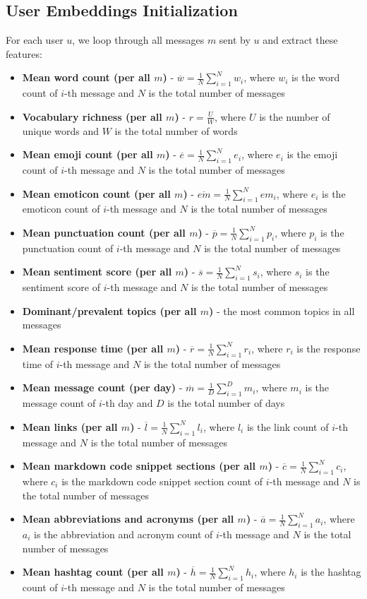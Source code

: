 \documentclass{article}
\begin{document}
\subsection{User Embeddings Initialization}
For each user $u$, we loop through all messages $m$ sent by $u$ and extract these features:
\begin{itemize}
	\item \textbf{Mean word count (per all $m$)} - \(\overline{w} = \frac{1}{N} \sum_{i=1}^{N} w_i \), where $w_i$ is the word count of $i$-th message and $N$ is the total number of messages
	\item \textbf{Vocabulary richness (per all $m$)} - \(r = \frac{U}{W} \), where $U$ is the number of unique words and $W$ is the total number of words
	\item \textbf{Mean emoji count (per all $m$)} - \(\overline{e} = \frac{1}{N} \sum_{i=1}^{N} e_i \), where $e_i$ is the emoji count of $i$-th message and $N$ is the total number of messages
	\item \textbf{Mean emoticon count (per all $m$)} - \(\overline{em} = \frac{1}{N} \sum_{i=1}^{N} em_i \), where $e_i$ is the emoticon count of $i$-th message and $N$ is the total number of messages
	\item \textbf{Mean punctuation count (per all $m$)} - \(\overline{p} = \frac{1}{N} \sum_{i=1}^{N} p_i \), where $p_i$ is the punctuation count of $i$-th message and $N$ is the total number of messages
	\item \textbf{Mean sentiment score (per all $m$)} - \(\overline{s} = \frac{1}{N} \sum_{i=1}^{N} s_i \), where $s_i$ is the sentiment score of $i$-th message and $N$ is the total number of messages
	\item \textbf{Dominant/prevalent topics (per all $m$)} - the most common topics in all messages
	\item \textbf{Mean response time (per all $m$)} - \(\overline{r} = \frac{1}{N} \sum_{i=1}^{N} r_i \), where $r_i$ is the response time of $i$-th message and $N$ is the total number of messages
	\item \textbf{Mean message count (per day)} - \(\overline{m} = \frac{1}{D} \sum_{i=1}^{D} m_i \), where $m_i$ is the message count of $i$-th day and $D$ is the total number of days
	\item \textbf{Mean links (per all $m$)} - \(\overline{l} = \frac{1}{N} \sum_{i=1}^{N} l_i \), where $l_i$ is the link count of $i$-th message and $N$ is the total number of messages
	\item \textbf{Mean markdown code snippet sections (per all $m$)} - \(\overline{c} = \frac{1}{N} \sum_{i=1}^{N} c_i \), where $c_i$ is the markdown code snippet section count of $i$-th message and $N$ is the total number of messages
	\item \textbf{Mean abbreviations and acronyms (per all $m$)} - \(\overline{a} = \frac{1}{N} \sum_{i=1}^{N} a_i \), where $a_i$ is the abbreviation and acronym count of $i$-th message and $N$ is the total number of messages
	\item \textbf{Mean hashtag count (per all $m$)} - \(\overline{h} = \frac{1}{N} \sum_{i=1}^{N} h_i \), where $h_i$ is the hashtag count of $i$-th message and $N$ is the total number of messages
\end{itemize}
\end{document}
